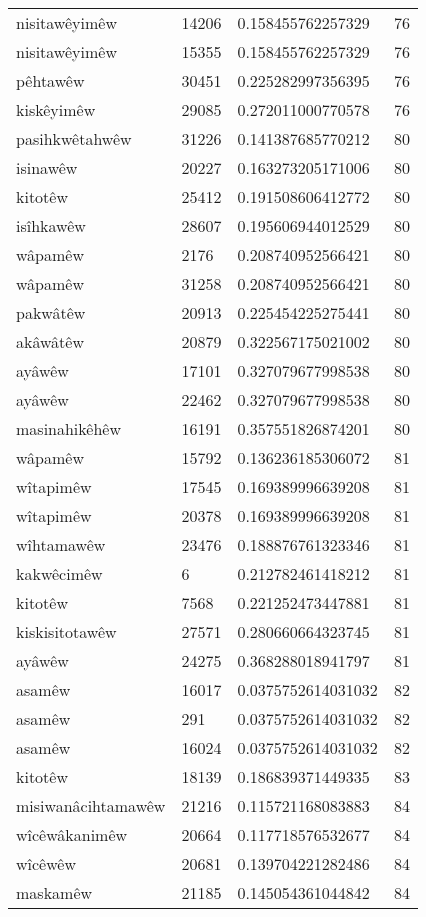\begin{longtable}{llll}
nisitawêyimêw & 14206 & 0.158455762257329 & 76\\
nisitawêyimêw & 15355 & 0.158455762257329 & 76\\
pêhtawêw & 30451 & 0.225282997356395 & 76\\
kiskêyimêw & 29085 & 0.272011000770578 & 76\\
pasihkwêtahwêw & 31226 & 0.141387685770212 & 80\\
isinawêw & 20227 & 0.163273205171006 & 80\\
kitotêw & 25412 & 0.191508606412772 & 80\\
isîhkawêw & 28607 & 0.195606944012529 & 80\\
wâpamêw & 2176 & 0.208740952566421 & 80\\
wâpamêw & 31258 & 0.208740952566421 & 80\\
pakwâtêw & 20913 & 0.225454225275441 & 80\\
akâwâtêw & 20879 & 0.322567175021002 & 80\\
ayâwêw & 17101 & 0.327079677998538 & 80\\
ayâwêw & 22462 & 0.327079677998538 & 80\\
masinahikêhêw & 16191 & 0.357551826874201 & 80\\
wâpamêw & 15792 & 0.136236185306072 & 81\\
wîtapimêw & 17545 & 0.169389996639208 & 81\\
wîtapimêw & 20378 & 0.169389996639208 & 81\\
wîhtamawêw & 23476 & 0.188876761323346 & 81\\
kakwêcimêw & 6 & 0.212782461418212 & 81\\
kitotêw & 7568 & 0.221252473447881 & 81\\
kiskisitotawêw & 27571 & 0.280660664323745 & 81\\
ayâwêw & 24275 & 0.368288018941797 & 81\\
asamêw & 16017 & 0.0375752614031032 & 82\\
asamêw & 291 & 0.0375752614031032 & 82\\
asamêw & 16024 & 0.0375752614031032 & 82\\
kitotêw & 18139 & 0.186839371449335 & 83\\
misiwanâcihtamawêw & 21216 & 0.115721168083883 & 84\\
wîcêwâkanimêw & 20664 & 0.117718576532677 & 84\\
wîcêwêw & 20681 & 0.139704221282486 & 84\\
maskamêw & 21185 & 0.145054361044842 & 84\\

\end{longtable}

